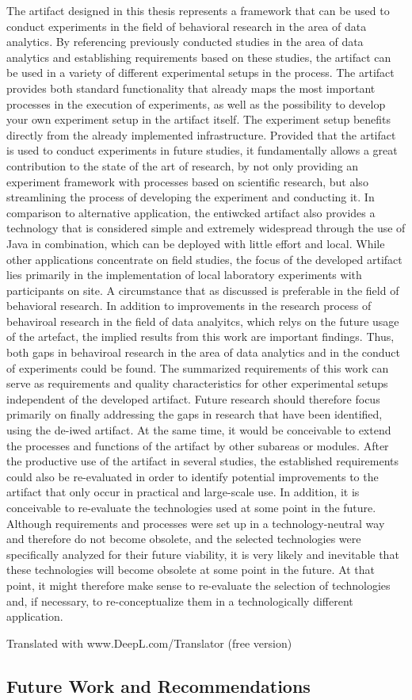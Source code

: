The artifact designed in this thesis represents a framework that can be used to conduct experiments in the field of behavioral research in the area of data analytics. By referencing previously conducted studies in the area of data analytics and establishing requirements based on these studies, the artifact can be used in a variety of different experimental setups in the process. The artifact provides both standard functionality that already maps the most important processes in the execution of experiments, as well as the possibility to develop your own experiment setup in the artifact itself. The experiment setup benefits directly from the already implemented infrastructure. Provided that the artifact is used to conduct experiments in future studies, it fundamentally allows a great contribution to the state of the art of research, by not only providing an experiment framework with processes based on scientific research, but also streamlining the process of developing the experiment and conducting it. In comparison to alternative application, the entiwcked artifact also provides a technology that is considered simple and extremely widespread through the use of Java in combination, which can be deployed with little effort and local. While other applications concentrate on field studies, the focus of the developed artifact lies primarily in the implementation of local laboratory experiments with participants on site. A circumstance that as discussed is preferable in the field of behavioral research. In addition to improvements in the research process of behaviroal research in the field of data analyitcs, which relys on the future usage of the artefact, the implied results from this work are important findings. Thus, both gaps in behaviroal research in the area of data analytics and in the conduct of experiments could be found. The summarized requirements of this work can serve as requirements and quality characteristics for other experimental setups independent of the developed artifact. Future research should therefore focus primarily on finally addressing the gaps in research that have been identified, using the de-iwed artifact. At the same time, it would be conceivable to extend the processes and functions of the artifact by other subareas or modules. After the productive use of the artifact in several studies, the established requirements could also be re-evaluated in order to identify potential improvements to the artifact that only occur in practical and large-scale use. In addition, it is conceivable to re-evaluate the technologies used at some point in the future. Although requirements and processes were set up in a technology-neutral way and therefore do not become obsolete, and the selected technologies were specifically analyzed for their future viability, it is very likely and inevitable that these technologies will become obsolete at some point in the future. At that point, it might therefore make sense to re-evaluate the selection of technologies and, if necessary, to re-conceptualize them in a technologically different application.

Translated with www.DeepL.com/Translator (free version)



\subsection{Future Work and Recommendations}